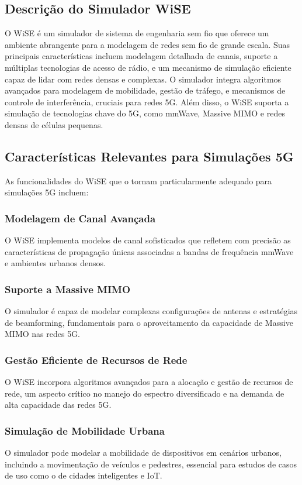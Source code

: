 \documentclass[journal]{IEEEtran}
\begin{document}
\subsection{Descrição do Simulador WiSE}

O WiSE é um simulador de sistema de engenharia sem fio que oferece um ambiente abrangente para a modelagem de redes sem fio de grande escala. Suas principais características incluem modelagem detalhada de canais, suporte a múltiplas tecnologias de acesso de rádio, e um mecanismo de simulação eficiente capaz de lidar com redes densas e complexas. O simulador integra algoritmos avançados para modelagem de mobilidade, gestão de tráfego, e mecanismos de controle de interferência, cruciais para redes 5G. Além disso, o WiSE suporta a simulação de tecnologias chave do 5G, como mmWave, Massive MIMO e redes densas de células pequenas.

\subsection{Características Relevantes para Simulações 5G}

As funcionalidades do WiSE que o tornam particularmente adequado para simulações 5G incluem:

\subsubsection{Modelagem de Canal Avançada} O WiSE implementa modelos de canal sofisticados que refletem com precisão as características de propagação únicas associadas a bandas de frequência mmWave e ambientes urbanos densos.

\subsubsection{Suporte a Massive MIMO} O simulador é capaz de modelar complexas configurações de antenas e estratégias de beamforming, fundamentais para o aproveitamento da capacidade de Massive MIMO nas redes 5G.

\subsubsection{Gestão Eficiente de Recursos de Rede} O WiSE incorpora algoritmos avançados para a alocação e gestão de recursos de rede, um aspecto crítico no manejo do espectro diversificado e na demanda de alta capacidade das redes 5G.

\subsubsection{Simulação de Mobilidade Urbana} O simulador pode modelar a mobilidade de dispositivos em cenários urbanos, incluindo a movimentação de veículos e pedestres, essencial para estudos de casos de uso como o de cidades inteligentes e IoT.
\end{document}
